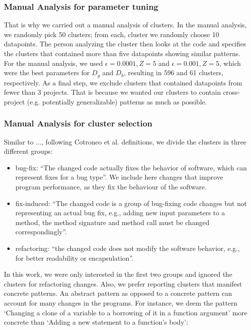 \subsubsection{\label{sec:manual_analysis_parameter_tuning}Manual Analysis for parameter tuning}

That is why we carried out a manual analysis of clusters. In the manual analysis, we randomly pick 50 clusters; from each, cluster we randomly choose 10 datapoints. The person analyzing the cluster then looks at the code and specifies the clusters that contained more than five datapoints showing similar patterns. For the manual analysis, we used $\epsilon=0.0001, Z=5$ and $\epsilon=0.001, Z=5$, which were the best parameters for $D_g$ and $D_b$, resulting in 596 and 61 clusters, respectively. As a final step, we exclude clusters that contained datapoints from fewer than 3 projects. That is because we wanted our clusters to contain cross-project (e.g. potentially generalizable) patterns as much as possible.  

\subsubsection{\label{sec:manual_analysis_cluster_selection}Manual Analysis for cluster selection}

Similar to ..., following Cotroneo et al. definitions, we divide the clusters in three different groups:

\begin{itemize}
    \item bug-fix: ``The changed code actually fixes the behavior of software, which can represent fixes for a bug type''. We include here changes that improve program performance, as they fix the behaviour of the software.
    
    \item fix-induced: ``The changed code is a group of bug-fixing code changes but not representing an actual bug fix, e.g., adding new input parameters to a method, the method signature and method call must be changed correspondingly''.
    
    \item refactoring: ``the changed code does not modify the software behavior, e.g., for better readability or encapsulation''.
\end{itemize}

In this work, we were only interested in the first two groups and ignored the clusters for refactoring changes. Also, we prefer reporting clusters that manifest concrete patterns. An abstract pattern as opposed to a concrete pattern can account for many changes in the programs. For instance, we deem the pattern `Changing a clone of a variable to a borrowing of it in a function argument' more concrete than `Adding a new statement to a function's body':

